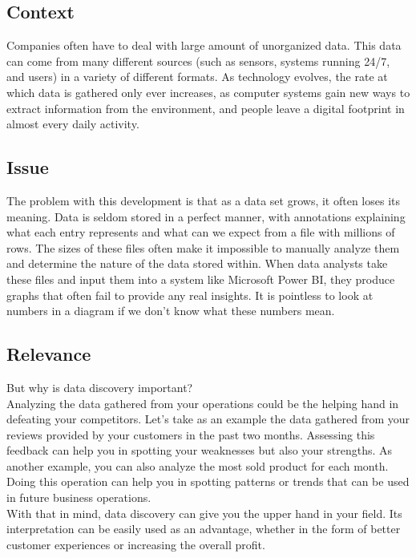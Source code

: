 \subsection{Context}
Companies often have to deal with large amount of unorganized data.
This data can come from many different sources (such as sensors, systems running 24/7, and users) in a variety of
different formats.
As technology evolves, the rate at which data is gathered only ever increases, as computer systems gain new ways to
extract information from the environment, and people leave a digital footprint in almost every daily activity.

\subsection{Issue}
The problem with this development is that as a data set grows, it often loses its meaning.
Data is seldom stored in a perfect manner, with annotations explaining what each entry represents and what can we
expect from a file with millions of rows.
The sizes of these files often make it impossible to manually analyze them and determine the nature of the data stored within.
When data analysts take these files and input them into a system like Microsoft Power BI, they produce graphs that often fail to
provide any real insights. 
It is pointless to look at numbers in a diagram if we don't know what these numbers mean.

\subsection{Relevance}
But why is data discovery important?
\vspace{5mm} %
\\Analyzing the data gathered from your operations could be the helping hand in defeating your competitors.
Let's take as an example the data gathered from your reviews provided by your customers in the past two months.
Assessing this feedback can help you in spotting your weaknesses but also your strengths.
As another example, you can also analyze the most sold product for each month.
Doing this operation can help you in spotting patterns or trends that can be used in future business operations.
\vspace{5mm} %
\\With that in mind, data discovery can give you the upper hand in your field.
Its interpretation can be easily used as an advantage, whether in the form of better customer experiences or increasing
the overall profit.

